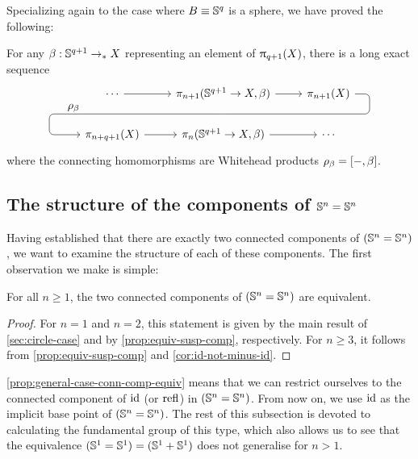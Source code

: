 \documentclass[english,a4paper]{lmcs}
\begin{document}
Specializing again to the case where $B \equiv {\mathbb S^{q}}$ is a sphere,
we have proved the following:
\begin{thm}\label{thm:sort-of-ehp}
  For any $\beta : {\mathbb S^{q+1}} \to_\ast X$ representing an element of $\uppi_{q+1}(X)$,
  there is a long exact sequence
  \[
    \begin{tikzcd}
      \cdots \ar[r]\ar[d,phantom, "\rho_\beta"{xshift=-8ex,yshift=1ex}] &
      \pi_{n+1}(\Sn{q+1} \to X, \beta)
      \ar[r] \ar[d, phantom, ""{coordinate, name=Z}] &
      \pi_{n+1}(X) \ar[dll, rounded corners,
      to path={ -- ([xshift=8.5ex]\tikztostart.center)
        |- (Z) [near end]\tikztonodes
        -| ([xshift=-13ex]\tikztotarget.center) -- (\tikztotarget)}] \\
      \pi_{n+q+1}(X) \ar[r] &
      \pi_n(\Sn{q+1} \to X,\beta) \ar[r] &
      \cdots
    \end{tikzcd}
  \]
  where the connecting homomorphisms are Whitehead products
  $\rho_\beta = [\mathord{{-}},\beta]$.
\end{thm}

\subsection{The structure of the components of
  \texorpdfstring{${\mathbb S^{n}} = {\mathbb S^{n}}$}{Sn = Sn}}

Having established that there are exactly two connected components of $({\mathbb S^{n}} = {\mathbb S^{n}})$, we want to examine the structure of each of these components.
The first observation we make is simple:

\begin{prop} \label{prop:general-case-conn-comp-equiv}
    For all $n \geq 1$, the two connected components of $({\mathbb S^{n}} = {\mathbb S^{n}})$ are equivalent.
\end{prop}
\begin{proof}
    For $n=1$ and $n=2$, this statement is given by the main result of \cref{sec:circle-case} and by \cref{prop:equiv-susp-comp}, respectively.
	For $n \geq 3$, it follows from \cref{prop:equiv-susp-comp} and \cref{cor:id-not-minus-id}.
\end{proof}

\cref{prop:general-case-conn-comp-equiv} means that we can restrict ourselves to the connected component of $\mathord{\mathrm{id}}$ (or $\mathop{{\mathrm{refl}}_{}}$) in $({\mathbb S^{n}} = {\mathbb S^{n}})$. From now on, we use $\mathord{\mathrm{id}}$ as the implicit base point of $({\mathbb S^{n}} = {\mathbb S^{n}})$.
The rest of this subsection is devoted to calculating the fundamental group of this type, which also allows us to see that the equivalence $({\mathbb S^{1}} = {\mathbb S^{1}}) = ({\mathbb S^{1}} + {\mathbb S^{1}})$ does not generalise for $n > 1$.
\end{document}
